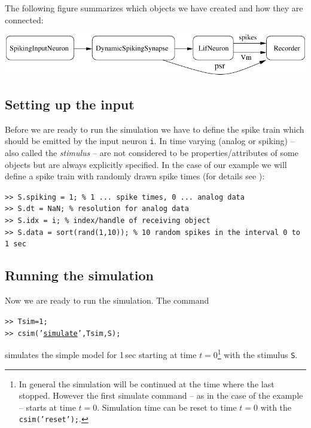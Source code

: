 The following figure summarizes which objects we have created and how
they are connected:

\begin{center}
\includegraphics{first-model-csim}
\end{center}

\subsection{Setting up the input} Before we are ready to run the
simulation we have to define the spike train which should be emitted
 by the input neuron \texttt{i}. In \csim time varying
  (analog or spiking) -- also
 called the \emph{stimulus} -- are not considered to be
 properties/attributes of some objects but are always explicitly
 specified. In the case of our example we will define a spike train
 with randomly drawn spike times (for details see ):
\begin{tabbing}
\quad\tt>> S.spiking = 1;                \% 1 ... spike times, 0 ... analog data\\
\quad\tt>> S.dt      = NaN;              \% resolution for analog data \\
\quad\tt>> S.idx     = i;                \% index/handle of receiving object\\
\quad\tt>> S.data    = sort(rand(1,10)); \% 10 random spikes in the interval 0 to 1 sec
\end{tabbing}

\subsection{Running the simulation} Now we are ready to run the
simulation. The command
%
\begin{tabbing}
\quad\tt>> Tsim=1; \\
\quad\tt>> csim('\hyperlink{cmd:simulate}{simulate}',Tsim,S);
\end{tabbing}
%
simulates the simple model for 1\,sec starting at time
$t=0$\footnote{In general the simulation will be continued at the time
where the last 
stopped. However the first simulate command -- as in the case of the
example -- starts at time $t=0$. Simulation time can be reset to time
$t=0$ with the 
\texttt{csim('reset');}.} with the stimulus \texttt{S}.


